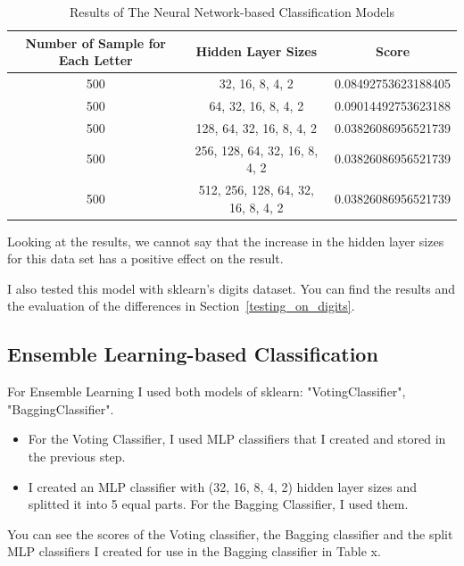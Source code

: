 \documentclass{article}
\begin{document}
\begin{flushleft}
\begin{table}[h]
    \centering
    \begin{tabular}{c|c|c}
    \hline
        Number of Sample for Each Letter & Hidden Layer Sizes & Score \\
    \hline
        500 & 32, 16, 8, 4, 2 & 0.08492753623188405 \\
        500 & 64, 32, 16, 8, 4, 2 & 0.09014492753623188 \\
        500 & 128, 64, 32, 16, 8, 4, 2 & 0.03826086956521739 \\
        500 & 256, 128, 64, 32, 16, 8, 4, 2 & 0.03826086956521739 \\
        500 & 512, 256, 128, 64, 32, 16, 8, 4, 2 & 0.03826086956521739 \\
    \hline
    \end{tabular}
    \caption{Results of The Neural Network-based Classification Models}
    \label{tab:neural_network}
\end{table}

Looking at the results, we cannot say that the increase in the hidden layer sizes for this data set has a positive effect on the result.

I also tested this model with sklearn's digits dataset. You can find the results and the evaluation of the differences in Section~\ref{testing_on_digits}.

\subsection{Ensemble Learning-based Classification}
For Ensemble Learning I used both models of sklearn: "VotingClassifier", "BaggingClassifier".

\begin{itemize}
    \item For the Voting Classifier, I used MLP classifiers that I created and stored in the previous step.
    \item I created an MLP classifier with (32, 16, 8, 4, 2) hidden layer sizes and splitted it into 5 equal parts. For the Bagging Classifier, I used them.
\end{itemize}

You can see the scores of the Voting classifier, the Bagging classifier and the split MLP classifiers I created for use in the Bagging classifier in Table x.


\end{flushleft}
\end{document}
